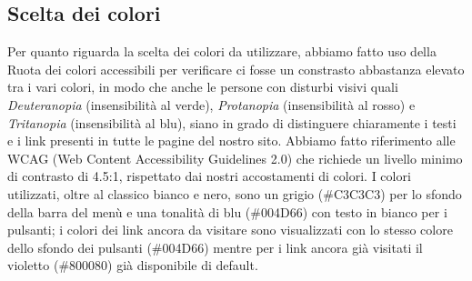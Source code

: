 \subsection{Scelta dei colori}
Per quanto riguarda la scelta dei colori da utilizzare, abbiamo fatto uso della Ruota dei colori accessibili per verificare ci fosse un constrasto abbastanza elevato tra i vari colori, in modo che anche le persone con disturbi visivi quali \emph{Deuteranopia} (insensibilità al verde), \emph{Protanopia} (insensibilità al rosso) e \emph{Tritanopia} (insensibilità al blu), siano in grado di distinguere chiaramente i testi e i link presenti in tutte le pagine del nostro sito.\newline
Abbiamo fatto riferimento alle WCAG (Web Content Accessibility Guidelines 2.0) che richiede un livello minimo di contrasto di 4.5:1, rispettato dai nostri accostamenti di colori.\newline
I colori utilizzati, oltre al classico bianco e nero, sono un grigio (\#C3C3C3) per lo sfondo della barra del menù e una tonalità di blu (\#004D66) con testo in bianco per i pulsanti; i colori dei link ancora da visitare sono visualizzati con lo stesso colore dello sfondo dei pulsanti (\#004D66) mentre per i link ancora già visitati il violetto (\#800080) già disponibile di default.
